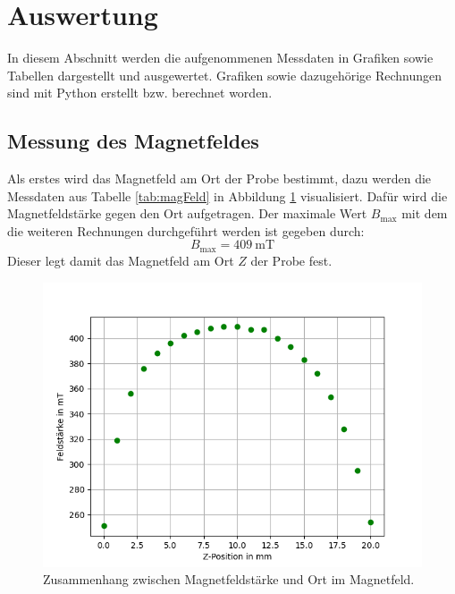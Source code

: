\newpage
\section{Auswertung}
\label{sec:Auswertung}
In diesem Abschnitt werden die aufgenommenen Messdaten in Grafiken sowie Tabellen dargestellt und ausgewertet. Grafiken sowie dazugehörige Rechnungen sind mit Python \cite{python} erstellt bzw. berechnet worden.

\subsection{Messung des Magnetfeldes}
\label{sec:magFeld}
Als erstes wird das Magnetfeld am Ort der Probe bestimmt, dazu werden die Messdaten aus Tabelle \ref{tab:magFeld} in Abbildung \ref{abb:magFeld} visualisiert. Dafür wird die Magnetfeldstärke gegen den Ort aufgetragen.
Der maximale Wert $B_\mathrm{max}$ mit dem die weiteren Rechnungen durchgeführt werden ist gegeben durch:
\begin{equation}
  B_\mathrm{max}=\SI{409}{\milli\tesla}
\end{equation}
Dieser legt damit das Magnetfeld am Ort $Z$ der Probe fest.
\begin{figure}[h!]
  \centering
  \includegraphics[scale=0.7]{fig/bfeld.png}
  \caption{Zusammenhang zwischen Magnetfeldstärke und Ort im Magnetfeld.}
  \label{abb:magFeld}
\end{figure}
\FloatBarrier

